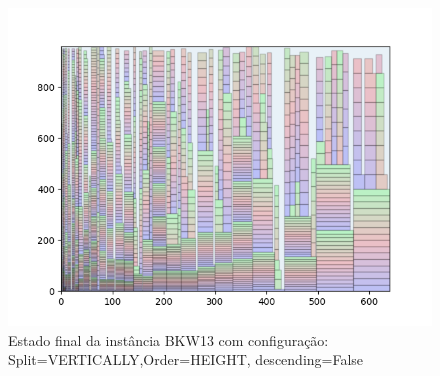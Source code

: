 \begin{figure}[H]
    \centering
    \caption[]{Estado final da instância BKW13 com configuração: Split=VERTICALLY,Order=HEIGHT, descending=False}
    \label{fig:bkw13-vertically-height-false}
    \includegraphics[scale=0.5]{output/figures/bkw/bkw13/vertically/height/false/0000}
\end{figure}